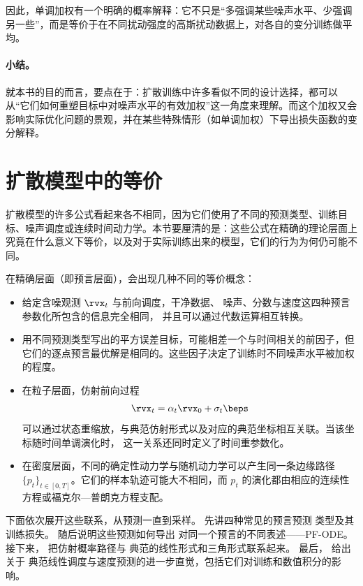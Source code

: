 因此，单调加权有一个明确的概率解释：它不只是“多强调某些噪声水平、少强调另一些”，而是等价于在不同扰动强度的高斯扰动数据上，对各自的变分训练做平均。

\paragraph{小结。}
就本书的目的而言，要点在于：扩散训练中许多看似不同的设计选择，都可以从“它们如何重塑目标中对噪声水平的有效加权”这一角度来理解。而这个加权又会影响实际优化问题的景观，并在某些特殊情形（如单调加权）下导出损失函数的变分解释。


\section{扩散模型中的等价}\label{sec:equivalent-parametrizations}
扩散模型的许多公式看起来各不相同，因为它们使用了不同的预测类型、训练目标、噪声调度或连续时间动力学。本节要厘清的是：这些公式在精确的理论层面上究竟在什么意义下等价，以及对于实际训练出来的模型，它们的行为为何仍可能不同。

在精确层面（即预言层面），会出现几种不同的等价概念：
\begin{itemize}
    \item {}
    给定含噪观测 $\rvx_t$ 与前向调度，干净数据、
    噪声、分数与速度这四种预言参数化所包含的信息完全相同，
    并且可以通过代数运算相互转换。

    \item {}
    用不同预测类型写出的平方误差目标，可能相差一个与时间相关的前因子，但它们的逐点预言最优解是相同的。这些因子决定了训练时不同噪声水平被加权的程度。

    \item {}
    在粒子层面，仿射前向过程
    \[
    \rvx_t=\alpha_t\rvx_0+\sigma_t\beps
    \]
    可以通过状态重缩放，与典范仿射形式以及对应的典范坐标相互关联。当该坐标随时间单调演化时，
    这一关系还同时定义了时间重参数化。

    \item {}
    在密度层面，不同的确定性动力学与随机动力学可以产生同一条边缘路径 $\{p_t\}_{t\in[0,T]}$。它们的样本轨迹可能大不相同，而 $p_t$ 的演化都由相应的连续性方程或福克尔—普朗克方程支配。
\end{itemize}
下面依次展开这些联系，从预测一直到采样。
 先讲四种常见的预言预测
类型及其训练损失。
 随后说明这些预测如何导出
对同一个预言的不同表述——PF-ODE。
接下来， 把仿射概率路径与
典范的线性形式和三角形式联系起来。
最后， 给出关于
典范线性调度与速度预测的进一步直觉，包括它们对训练和数值积分的影响。

